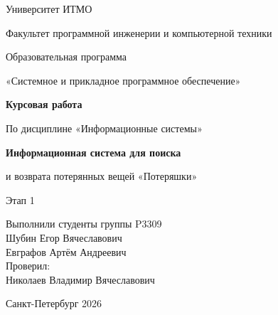\documentclass[14pt,a4paper]{extarticle}
\begin{document}
\begin{titlepage}
\begin{center}
{\fontsize{18}{22}\selectfont Университет ИТМО\par}
\vspace{8mm}
{\fontsize{16}{20}\selectfont Факультет программной инженерии и компьютерной техники\par
Образовательная программа\par
«Системное и прикладное программное обеспечение»\par}
\vspace{30mm}
{\fontsize{16}{22}\selectfont\bfseries Курсовая работа\par
По дисциплине «Информационные системы»\par}
\vspace{10mm}
{\fontsize{16}{22}\selectfont\bfseries Информационная система для поиска\par
и возврата потерянных вещей «Потеряшки»\par}
\vspace{8mm}
{\fontsize{16}{20}\selectfont Этап 1\par}
\end{center}
\vspace{20mm}
\begin{flushright}
Выполнили студенты группы P3309\\
Шубин Егор Вячеславович\\
Евграфов Артём Андреевич\\
\vspace{7mm}
Проверил:\\
Николаев Владимир Вячеславович
\end{flushright}
\vfill
\begin{center}
Санкт-Петербург 2026
\end{center}
\end{titlepage}

\tableofcontents

\end{document}
